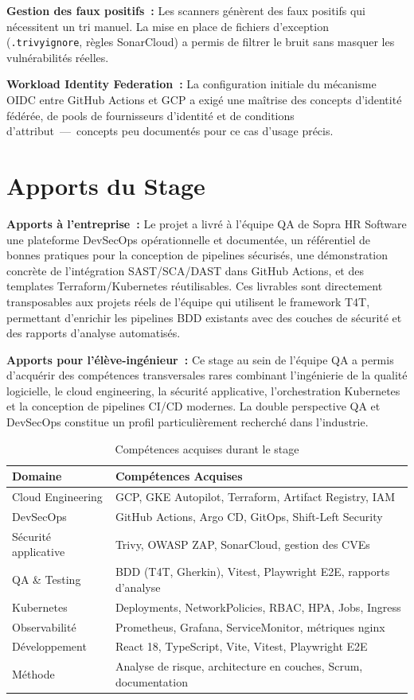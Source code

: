 \textbf{Gestion des faux positifs~:} Les scanners génèrent des faux positifs qui
nécessitent un tri manuel. La mise en place de fichiers d'exception (\texttt{.trivyignore},
règles SonarCloud) a permis de filtrer le bruit sans masquer les vulnérabilités réelles.

\textbf{Workload Identity Federation~:} La configuration initiale du mécanisme OIDC
entre GitHub Actions et GCP a exigé une maîtrise des concepts d'identité fédérée,
de pools de fournisseurs d'identité et de conditions d'attribut~---~concepts peu documentés
pour ce cas d'usage précis.

\section*{Apports du Stage}

\textbf{Apports à l'entreprise~:} Le projet a livré à l'équipe QA de Sopra HR Software une
plateforme DevSecOps opérationnelle et documentée, un référentiel de bonnes pratiques pour
la conception de pipelines sécurisés, une démonstration concrète de l'intégration SAST/SCA/DAST
dans GitHub Actions, et des templates Terraform/Kubernetes réutilisables. Ces livrables sont
directement transposables aux projets réels de l'équipe qui utilisent le framework T4T,
permettant d'enrichir les pipelines BDD existants avec des couches de sécurité et des rapports
d'analyse automatisés.

\textbf{Apports pour l'élève-ingénieur~:} Ce stage au sein de l'équipe QA a permis d'acquérir
des compétences transversales rares combinant l'ingénierie de la qualité logicielle, le cloud
engineering, la sécurité applicative, l'orchestration Kubernetes et la conception de pipelines
CI/CD modernes. La double perspective QA et DevSecOps constitue un profil particulièrement
recherché dans l'industrie.

\begin{table}[h]
\centering
\caption{Compétences acquises durant le stage}
\label{tab:competences}
\begin{tabularx}{\textwidth}{|l|X|}
\hline
\rowcolor{gray!20}\textbf{Domaine} & \textbf{Compétences Acquises} \\
\hline
Cloud Engineering & GCP, GKE Autopilot, Terraform, Artifact Registry, IAM \\
\hline
DevSecOps & GitHub Actions, Argo CD, GitOps, Shift-Left Security \\
\hline
Sécurité applicative & Trivy, OWASP ZAP, SonarCloud, gestion des CVEs \\
\hline
QA \& Testing & BDD (T4T, Gherkin), Vitest, Playwright E2E, rapports d'analyse \\
\hline
Kubernetes & Deployments, NetworkPolicies, RBAC, HPA, Jobs, Ingress \\
\hline
Observabilité & Prometheus, Grafana, ServiceMonitor, métriques nginx \\
\hline
Développement & React 18, TypeScript, Vite, Vitest, Playwright E2E \\
\hline
Méthode & Analyse de risque, architecture en couches, Scrum, documentation \\
\hline
\end{tabularx}
\end{table}

